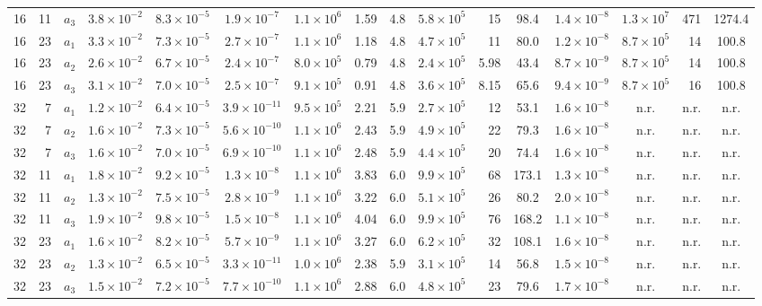 \begin{table}[t]
\begin{ruledtabular}
\begin{tabular}{rrrc|cccrc|crcc|crc}
16 & 11 & $a_3$ & $3.8\times10^{-2}$ & $8.3\times10^{-5}$ & $1.9\times10^{-7}$ & $1.1\times10^{6}$ & 1.59 & 4.8 & $5.8\times10^{5}$ & 15 & 98.4 & $1.4\times10^{-8}$ & $1.3\times10^{7}$ & 471 & 1274.4 \\
16 & 23 & $a_1$ & $3.3\times10^{-2}$ & $7.3\times10^{-5}$ & $2.7\times10^{-7}$ & $1.1\times10^{6}$ & 1.18 & 4.8 & $4.7\times10^{5}$ & 11 & 80.0 & $1.2\times10^{-8}$ & $8.7\times10^{5}$ & 14 & 100.8 \\
16 & 23 & $a_2$ & $2.6\times10^{-2}$ & $6.7\times10^{-5}$ & $2.4\times10^{-7}$ & $8.0\times10^{5}$ & 0.79 & 4.8 & $2.4\times10^{5}$ & 5.98 & 43.4 & $8.7\times10^{-9}$ & $8.7\times10^{5}$ & 14 & 100.8 \\
16 & 23 & $a_3$ & $3.1\times10^{-2}$ & $7.0\times10^{-5}$ & $2.5\times10^{-7}$ & $9.1\times10^{5}$ & 0.91 & 4.8 & $3.6\times10^{5}$ & 8.15 & 65.6 & $9.4\times10^{-9}$ & $8.7\times10^{5}$ & 16 & 100.8 \\
32 & 7 & $a_1$ & $1.2\times10^{-2}$ & $6.4\times10^{-5}$ & $3.9\times10^{-11}$ & $9.5\times10^{5}$ & 2.21 & 5.9 & $2.7\times10^{5}$ & 12 & 53.1 & $1.6\times10^{-8}$ & n.r. & n.r. & n.r. \\
32 & 7 & $a_2$ & $1.6\times10^{-2}$ & $7.3\times10^{-5}$ & $5.6\times10^{-10}$ & $1.1\times10^{6}$ & 2.43 & 5.9 & $4.9\times10^{5}$ & 22 & 79.3 & $1.6\times10^{-8}$ & n.r. & n.r. & n.r. \\
32 & 7 & $a_3$ & $1.6\times10^{-2}$ & $7.0\times10^{-5}$ & $6.9\times10^{-10}$ & $1.1\times10^{6}$ & 2.48 & 5.9 & $4.4\times10^{5}$ & 20 & 74.4 & $1.6\times10^{-8}$ & n.r. & n.r. & n.r. \\
32 & 11 & $a_1$ & $1.8\times10^{-2}$ & $9.2\times10^{-5}$ & $1.3\times10^{-8}$ & $1.1\times10^{6}$ & 3.83 & 6.0 & $9.9\times10^{5}$ & 68 & 173.1 & $1.3\times10^{-8}$ & n.r. & n.r. & n.r. \\
32 & 11 & $a_2$ & $1.3\times10^{-2}$ & $7.5\times10^{-5}$ & $2.8\times10^{-9}$ & $1.1\times10^{6}$ & 3.22 & 6.0 & $5.1\times10^{5}$ & 26 & 80.2 & $2.0\times10^{-8}$ & n.r. & n.r. & n.r. \\
32 & 11 & $a_3$ & $1.9\times10^{-2}$ & $9.8\times10^{-5}$ & $1.5\times10^{-8}$ & $1.1\times10^{6}$ & 4.04 & 6.0 & $9.9\times10^{5}$ & 76 & 168.2 & $1.1\times10^{-8}$ & n.r. & n.r. & n.r. \\
32 & 23 & $a_1$ & $1.6\times10^{-2}$ & $8.2\times10^{-5}$ & $5.7\times10^{-9}$ & $1.1\times10^{6}$ & 3.27 & 6.0 & $6.2\times10^{5}$ & 32 & 108.1 & $1.6\times10^{-8}$ & n.r. & n.r. & n.r. \\
32 & 23 & $a_2$ & $1.3\times10^{-2}$ & $6.5\times10^{-5}$ & $3.3\times10^{-11}$ & $1.0\times10^{6}$ & 2.38 & 5.9 & $3.1\times10^{5}$ & 14 & 56.8 & $1.5\times10^{-8}$ & n.r. & n.r. & n.r. \\
32 & 23 & $a_3$ & $1.5\times10^{-2}$ & $7.2\times10^{-5}$ & $7.7\times10^{-10}$ & $1.1\times10^{6}$ & 2.88 & 6.0 & $4.8\times10^{5}$ & 23 & 79.6 & $1.7\times10^{-8}$ & n.r. & n.r. & n.r. \\
\end{tabular}
\end{ruledtabular}
\end{table}
